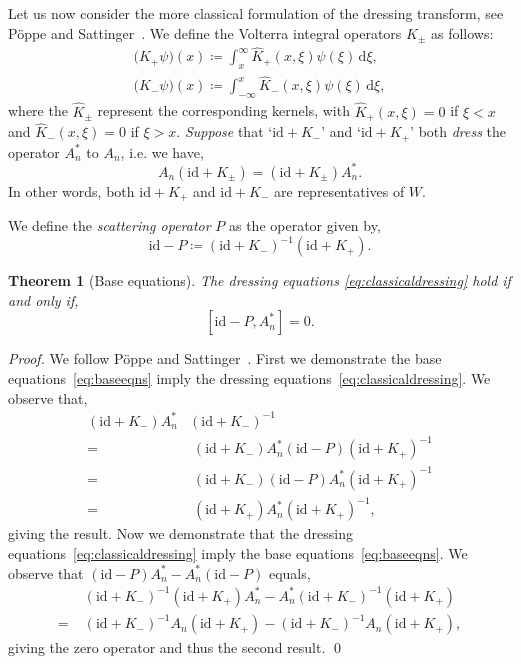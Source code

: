 \documentclass[5p,twocolumn]{elsarticle}
\newcommand*{\id}{{\mathrm{id}}}
\newcommand*{\rd}{{\mathrm{d}}}
\newtheorem{theorem}{Theorem}
\begin{document}
Let us now consider the more classical formulation of the dressing transform, see P\"oppe and Sattinger~\cite{PoppeSattinger}.
We define the Volterra integral operators $K_{\pm}$ as follows:
\begin{align*}
\bigl(K_+\psi\bigr)(x)\coloneqq\int_x^\infty \hat K_+(x,\xi)\psi(\xi)\,\rd \xi,\\
\bigl(K_-\psi\bigr)(x)\coloneqq\int_{-\infty}^x \hat K_-(x,\xi)\psi(\xi)\,\rd \xi,
\end{align*}
where the $\hat{K}_{\pm}$ represent the corresponding kernels, with $\hat{K}_+(x,\xi)=0$ if $\xi<x$ and $\hat{K}_-(x,\xi)=0$ if $\xi>x$. 
\emph{Suppose} that `$\id+K_-$' and `$\id+K_+$' both \emph{dress} the operator $A_n^\ast$ to $A_n$, i.e.\/ we have, 
\begin{equation}\label{eq:classicaldressing}
A_n(\id+K_\pm)=(\id+K_\pm)A_n^\ast. 
\end{equation}
In other words, both $\id+K_+$ and $\id+K_-$ are representatives of $W$.
%
\begin{definition}\label{def:scatteringoperator}
We define the \emph{scattering operator} $P$ as the operator given by,
\begin{equation}\label{eq:scatteringoperator}
\id-P\coloneqq(\id+K_-)^{-1}(\id+K_+). 
\end{equation}
\end{definition}
%
\begin{theorem}[Base equations]\label{thm:baseeqns}
The dressing equations \eqref{eq:classicaldressing} hold if and only if,
\begin{equation}\label{eq:baseeqns}
[\id-P,A_n^\ast]=0. 
\end{equation}
\end{theorem}
%
\begin{proof}
  We follow P\"oppe and Sattinger~\cite{PoppeSattinger}.
  First we demonstrate the base equations~\eqref{eq:baseeqns} imply the dressing equations~\eqref{eq:classicaldressing}. 
  We observe that, 
  \begin{align*}
    (\id+K_-)A_n^\ast&(\id+K_-)^{-1}\\
                   =&\;(\id+K_-)A_n^\ast(\id-P)(\id+K_+)^{-1}\\
                   =&\;(\id+K_-)(\id-P)A_n^\ast(\id+K_+)^{-1}\\
                   =&\;(\id+K_+)A_n^\ast(\id+K_+)^{-1},
  \end{align*}
  giving the result. Now we demonstrate that the dressing equations~\eqref{eq:classicaldressing} imply the base equations~\eqref{eq:baseeqns}. 
  We observe that $(\id-P)A_n^\ast-A_n^\ast(\id-P)$ equals,
  \begin{align*}
     &\;(\id+K_-)^{-1}(\id+K_+)A_n^\ast-A_n^\ast(\id+K_-)^{-1}(\id+K_+)\\
    =&\;(\id+K_-)^{-1}A_n(\id+K_+)-(\id+K_-)^{-1}A_n(\id+K_+),
  \end{align*}
  giving the zero operator and thus the second result.
\qed
\end{proof}
\end{document}
